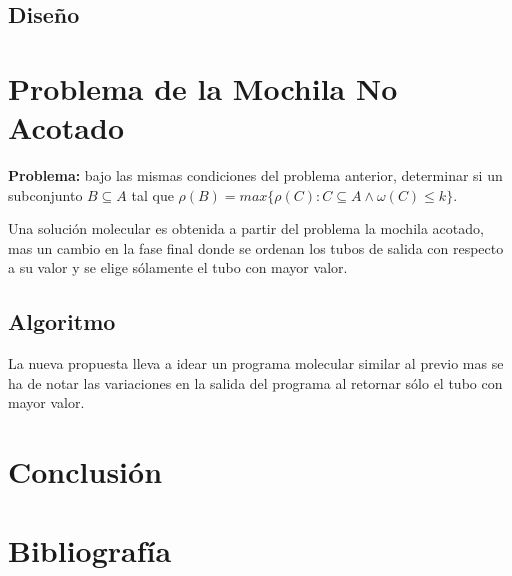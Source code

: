 \documentclass[12pt, letterpaper, twoside]{article}
\begin{document}
    \subsection{Diseño}
    \newpage
    \section{Problema de la Mochila No Acotado}
    \textbf{Problema:} bajo las mismas condiciones del problema anterior, determinar si un subconjunto $B\subseteq A$ tal que $\rho(B) =max\{\rho(C):C\subseteq A \land\omega(C) \leq k\}$.


    Una solución molecular es obtenida a partir del problema la mochila acotado, mas un cambio en la fase final donde se ordenan los tubos de salida con respecto a su valor y se elige sólamente el tubo con mayor valor.

    \subsection{Algoritmo}
    La nueva propuesta lleva a idear un programa molecular similar al previo mas se ha de notar las variaciones en la salida del programa al retornar sólo el tubo con mayor valor.
    \begin{algorithm}
        \begin{algorithmic}[1]
            \EndFor
                \Else
                \EndIf
            \EndWhile
            \EndProcedure
        \end{algorithmic}
    \end{algorithm}

    \section{Conclusión}

    \section{Bibliografía}
    \newpage
    \printbibliography
\end{document}
